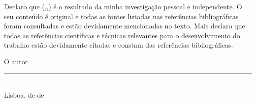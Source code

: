 \makeatletter
Declaro que %
\MakeLowercase{\thedoctypestr(\iselthesis@opt@docdegree,\iselthesis@opt@doctype,\iselthesis@opt@coverlang)} é o resultado da minha investigação pessoal e independente. O seu conteúdo é original e todas as fontes listadas nas referências bibliográficas foram consultadas e estão devidamente mencionadas no texto. Mais declaro que todas as referências científicas e técnicas relevantes para o desenvolvimento do trabalho estão devidamente citadas e constam das referências bibliográficas.
\makeatother
\begin{center}
O autor
\\[3em]

\rule{.5\textwidth}{1pt}
\\[.5em]
\fontsize{10}{12.2}
\selectfont
Lisboa, \thedateday{ }de \thedatemonth{ }de{ }\thedateyear
\end{center}

